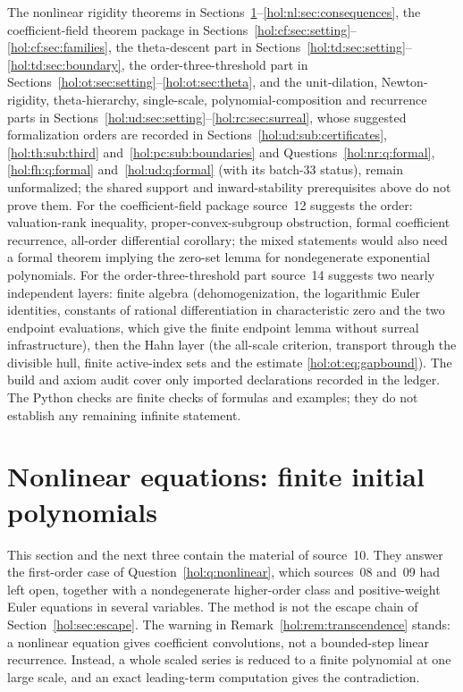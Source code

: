 \documentclass[11pt]{article}
\numberwithin{equation}{section}
\theoremstyle{definition}
\theoremstyle{remark}
\begin{document}
The nonlinear rigidity theorems in
Sections~\ref{hol:nl:sec:setting}--\ref{hol:nl:sec:consequences},
the coefficient-field theorem package in
Sections~\ref{hol:cf:sec:setting}--\ref{hol:cf:sec:families}, the
theta-descent part in
Sections~\ref{hol:td:sec:setting}--\ref{hol:td:sec:boundary}, the
order-three-threshold part in
Sections~\ref{hol:ot:sec:setting}--\ref{hol:ot:sec:theta}, and the
unit-dilation, Newton-rigidity, theta-hierarchy, single-scale,
polynomial-composition and recurrence parts in
Sections~\ref{hol:ud:sec:setting}--\ref{hol:rc:sec:surreal}, whose
suggested formalization orders are recorded in
Sections~\ref{hol:ud:sub:certificates}, \ref{hol:th:sub:third}
and~\ref{hol:pc:sub:boundaries} and
Questions~\ref{hol:nr:q:formal}, \ref{hol:fh:q:formal}
and~\ref{hol:ud:q:formal} (with its batch-33 status),
remain unformalized; the shared support and inward-stability prerequisites
above do not prove them. For the coefficient-field package source~12 suggests
the order:
valuation-rank inequality, proper-convex-subgroup obstruction, formal
coefficient recurrence, all-order differential corollary; the mixed
statements would also need a formal theorem implying the zero-set lemma
for nondegenerate exponential polynomials. For the order-three-threshold part
source~14 suggests two nearly independent layers: finite algebra
(dehomogenization, the logarithmic Euler identities, constants of rational
differentiation in characteristic zero and the two endpoint evaluations,
which give the finite endpoint lemma without surreal infrastructure), then
the Hahn layer (the all-scale criterion, transport through the divisible
hull, finite active-index sets and the estimate
\eqref{hol:ot:eq:gapbound}). The build and axiom audit cover
only imported declarations recorded in the ledger. The Python checks are
finite checks of formulas and examples; they do not establish any remaining
infinite statement.

\section{Nonlinear equations: finite initial polynomials}
\label{hol:nl:sec:setting}

This section and the next three contain the material of source~10. They
answer the first-order case of Question~\ref{hol:q:nonlinear}, which
sources~08 and~09 had left open, together with a nondegenerate higher-order
class and positive-weight Euler equations in several variables. The method is
not the escape chain of Section~\ref{hol:sec:escape}. The warning in
Remark~\ref{hol:rem:transcendence} stands: a nonlinear equation gives
coefficient convolutions, not a bounded-step linear recurrence. Instead, a
whole scaled series is reduced to a finite polynomial at one large scale, and
an exact leading-term computation gives the contradiction.
\end{document}
